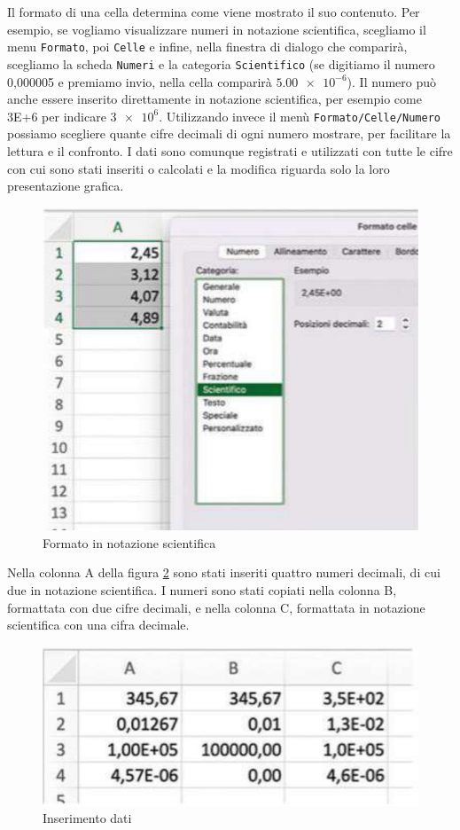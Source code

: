 \documentclass[12pt,a4paper,oneside]{book}
\theoremstyle{esercizio}
\begin{document}
Il formato di una cella determina come viene mostrato il suo contenuto.
 Per esempio, se vogliamo visualizzare numeri in notazione scientifica, scegliamo
  il menu \texttt{Formato}, poi \texttt{Celle} e infine, nella finestra di dialogo che comparirà, 
  scegliamo la scheda \texttt{Numeri} e la categoria \texttt{Scientifico} 
  (se digitiamo il numero 0,000005 e premiamo invio, 
  nella cella comparirà $\num{5,00e-6}$).
  Il numero può anche essere inserito direttamente in notazione scientifica,
   per esempio come 3E+6 per indicare $\num{3e+6}$.
  Utilizzando invece il menù \texttt{Formato/Celle/Numero} possiamo scegliere
   quante cifre decimali di ogni numero mostrare, per facilitare
    la lettura e il confronto. I dati sono comunque registrati e utilizzati 
    con tutte le cifre con cui sono stati inseriti o calcolati e 
    la modifica riguarda solo la loro presentazione grafica.
  \begin{figure}[h!]
    \centering
    \includegraphics[scale=0.4]{path_to_image/formato-cella.png} 
    \caption{Formato in notazione scientifica}
    \label{fig:formatocella}
\end{figure} 

Nella colonna A della figura \ref{fig:insdati} sono stati inseriti quattro numeri decimali, di cui due in notazione scientifica. I numeri sono stati copiati nella colonna B, formattata con due cifre decimali, 
e nella colonna C, formattata in notazione scientifica con una cifra decimale.
\begin{figure}[h!]
    \centering
    \includegraphics[scale=0.4]{path_to_image/inserimento-dati.png} 
    \caption{Inserimento dati}
    \label{fig:insdati}
\end{figure}
\end{document}
